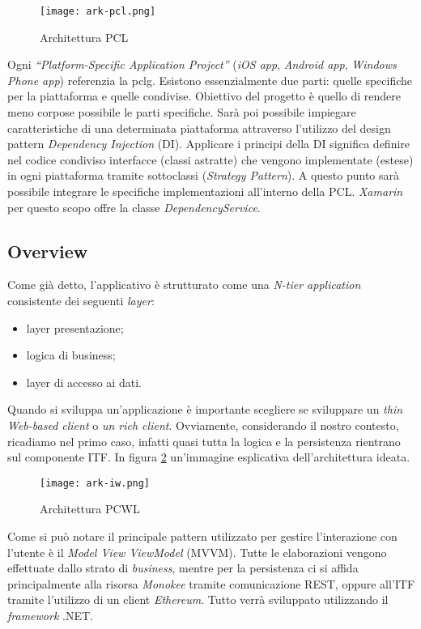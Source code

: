 \begin{figure}[!h]
    
    \centering
    \texttt{[image: ark-pcl.png]} 
    \caption{Architettura PCL}
    \label{fig:ark-pcl} 
\end{figure}

Ogni \emph{“Platform-Specific Application Project”} (\emph{iOS app}, \emph{Android app}, \emph{Windows Phone app}) referenzia la \gls{pclg}. Esistono essenzialmente due parti: quelle specifiche per la piattaforma e quelle condivise. Obiettivo del progetto è quello di rendere meno corpose possibile le parti specifiche. Sarà poi possibile impiegare caratteristiche di una determinata piattaforma attraverso l’utilizzo del design pattern \emph{Dependency Injection} (DI).
Applicare i principi della DI significa definire nel codice condiviso interfacce (classi astratte) che vengono implementate (estese) in ogni piattaforma tramite sottoclassi (\emph{Strategy Pattern}). A questo punto sarà possibile integrare le specifiche implementazioni all’interno della PCL. \emph{Xamarin} per questo scopo offre la classe \emph{DependencyService}.

\subsection{Overview}
Come già detto, l’applicativo è strutturato come una \emph{N-tier application} consistente dei seguenti \emph{layer}:
\begin{itemize}
    \item layer presentazione;
    \item logica di business;
    \item layer di accesso ai dati. 
\end{itemize}
    
Quando si sviluppa un’applicazione è importante scegliere se sviluppare un \emph{thin Web-based client} o \emph{un rich client}. Ovviamente, considerando il nostro contesto, ricadiamo nel primo caso, infatti quasi tutta la logica e la persistenza rientrano sul componente ITF. In figura \ref{fig:ark-iw} un'immagine esplicativa dell'architettura ideata.
\begin{figure}[htbp]
    
    \centering
    \texttt{[image: ark-iw.png]} 
    \caption{Architettura PCWL}
    \label{fig:ark-iw} 
\end{figure}
Come si può notare il principale pattern utilizzato per gestire l’interazione con l’utente è il \emph{Model View ViewModel} (MVVM). Tutte le elaborazioni vengono effettuate dallo strato di \emph{business}, mentre per la persistenza ci si affida principalmente alla risorsa \emph{Monokee} tramite comunicazione REST, oppure all’ITF tramite l’utilizzo di un client \emph{Ethereum}. Tutto verrà sviluppato utilizzando il \emph{framework} .NET.


